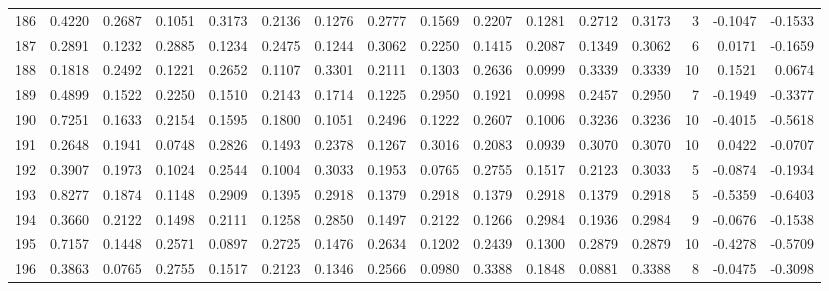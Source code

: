 \begin{tabular}{lrrrrrrrrrrrrrrr}
186 &      0.4220 &  0.2687 &  0.1051 &  0.3173 &  0.2136 &  0.1276 &  0.2777 &  0.1569 &  0.2207 &  0.1281 &   0.2712 &     0.3173 &      3 &                   -0.1047 &                    -0.1533 \\
187 &      0.2891 &  0.1232 &  0.2885 &  0.1234 &  0.2475 &  0.1244 &  0.3062 &  0.2250 &  0.1415 &  0.2087 &   0.1349 &     0.3062 &      6 &                    0.0171 &                    -0.1659 \\
188 &      0.1818 &  0.2492 &  0.1221 &  0.2652 &  0.1107 &  0.3301 &  0.2111 &  0.1303 &  0.2636 &  0.0999 &   0.3339 &     0.3339 &     10 &                    0.1521 &                     0.0674 \\
189 &      0.4899 &  0.1522 &  0.2250 &  0.1510 &  0.2143 &  0.1714 &  0.1225 &  0.2950 &  0.1921 &  0.0998 &   0.2457 &     0.2950 &      7 &                   -0.1949 &                    -0.3377 \\
190 &      0.7251 &  0.1633 &  0.2154 &  0.1595 &  0.1800 &  0.1051 &  0.2496 &  0.1222 &  0.2607 &  0.1006 &   0.3236 &     0.3236 &     10 &                   -0.4015 &                    -0.5618 \\
191 &      0.2648 &  0.1941 &  0.0748 &  0.2826 &  0.1493 &  0.2378 &  0.1267 &  0.3016 &  0.2083 &  0.0939 &   0.3070 &     0.3070 &     10 &                    0.0422 &                    -0.0707 \\
192 &      0.3907 &  0.1973 &  0.1024 &  0.2544 &  0.1004 &  0.3033 &  0.1953 &  0.0765 &  0.2755 &  0.1517 &   0.2123 &     0.3033 &      5 &                   -0.0874 &                    -0.1934 \\
193 &      0.8277 &  0.1874 &  0.1148 &  0.2909 &  0.1395 &  0.2918 &  0.1379 &  0.2918 &  0.1379 &  0.2918 &   0.1379 &     0.2918 &      5 &                   -0.5359 &                    -0.6403 \\
194 &      0.3660 &  0.2122 &  0.1498 &  0.2111 &  0.1258 &  0.2850 &  0.1497 &  0.2122 &  0.1266 &  0.2984 &   0.1936 &     0.2984 &      9 &                   -0.0676 &                    -0.1538 \\
195 &      0.7157 &  0.1448 &  0.2571 &  0.0897 &  0.2725 &  0.1476 &  0.2634 &  0.1202 &  0.2439 &  0.1300 &   0.2879 &     0.2879 &     10 &                   -0.4278 &                    -0.5709 \\
196 &      0.3863 &  0.0765 &  0.2755 &  0.1517 &  0.2123 &  0.1346 &  0.2566 &  0.0980 &  0.3388 &  0.1848 &   0.0881 &     0.3388 &      8 &                   -0.0475 &                    -0.3098 \\

\end{tabular}
